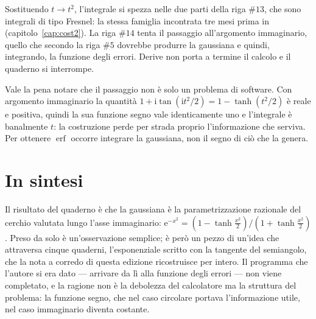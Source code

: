 Sostituendo $t\to t^2$, l'integrale si spezza nelle due parti della riga $\#13$, che sono integrali di tipo Fresnel: la stessa famiglia incontrata tre mesi prima in  (capitolo~\ref{cap:cost2}). La riga $\#14$ tenta il passaggio all'argomento immaginario, quello che secondo la riga $\#5$ dovrebbe produrre la gaussiana e quindi, integrando, la funzione degli errori. Derive non porta a termine il calcolo e il quaderno si interrompe.

Vale la pena notare che il passaggio non è solo un problema di software. Con argomento immaginario la quantità $1+\mathrm{i}\tan\!\left(\mathrm{i}t^2/2\right)=1-\tanh(t^2/2)$ è reale e positiva, quindi la sua funzione segno vale identicamente uno e l'integrale è banalmente $t$: la costruzione perde per strada proprio l'informazione che serviva. Per ottenere $\operatorname{erf}$ occorre integrare la gaussiana, non il segno di ciò che la genera.

\section*{In sintesi}

Il risultato del quaderno è che la gaussiana è la parametrizzazione razionale del cerchio valutata lungo l'asse immaginario: $\mathrm{e}^{-x^2}=\left(1-\tanh\tfrac{x^2}{2}\right)/\left(1+\tanh\tfrac{x^2}{2}\right)$. Preso da solo è un'osservazione semplice; è però un pezzo di un'idea che attraversa cinque quaderni, l'esponenziale scritto con la tangente del semiangolo, che la nota a corredo di questa edizione ricostruisce per intero. Il programma che l'autore si era dato — arrivare da lì alla funzione degli errori — non viene completato, e la ragione non è la debolezza del calcolatore ma la struttura del problema: la funzione segno, che nel caso circolare portava l'informazione utile, nel caso immaginario diventa costante.

